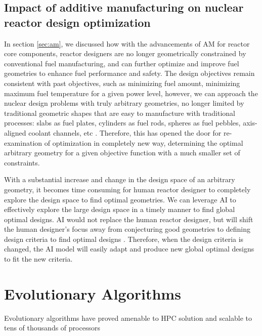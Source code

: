 \subsection{Impact of additive manufacturing on nuclear reactor design 
optimization}
In section \ref{sec:am}, we discussed how with the advancements of \gls{AM} 
for reactor core components, reactor designers are no longer geometrically 
constrained by conventional fuel manufacturing, and can further optimize and 
improve fuel geometries to enhance fuel performance and safety. 
The design objectives remain consistent with past objectives, such as minimizing 
fuel amount, minimizing maximum fuel temperature for a given power level, 
however, we can approach the nuclear design problems with truly arbitrary 
geometries, no longer limited by traditional geometric shapes that are 
easy to manufacture with traditional processes: slabs as fuel plates, cylinders 
as fuel rods, spheres as fuel pebbles, axis-aligned coolant channels, etc  
\cite{sobes_artificial_2020}.
Therefore, this has opened the door for re-examination of optimization in 
completely new way, determining the optimal arbitrary geometry for a given objective 
function \cite{sobes_artificial_2020} with a much smaller set of constraints. 

With a substantial increase and change in the design space of an arbitrary 
geometry, it becomes time consuming for human reactor designer to completely 
explore the design space to find optimal geometries. 
We can leverage \gls{AI} to effectively explore the large design space in a 
timely manner to find global optimal designs. 
\gls{AI} would not replace the human reactor designer, but will shift the 
human designer's focus away from conjecturing good geometries to defining 
design criteria to find optimal designs \cite{sobes_artificial_2020}. 
Therefore, when the design criteria is changed, the \gls{AI} model will easily 
adapt and produce new global optimal designs to fit the new criteria.  


\section{Evolutionary Algorithms}
Evolutionary algorithms have proved amenable to \gls{HPC} solution and 
scalable to tens of thousands of processors \cite{kropaczek_constraint_2019}
